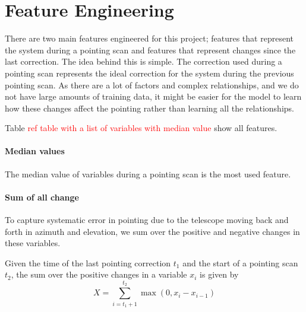 \section{Feature Engineering}\label{sec:feature_engineering}
There are two main features engineered for this project; features that represent the system during a pointing scan and features that represent changes since the last correction. 
The idea behind this is simple. The correction used during a pointing scan represents the ideal correction for the system during the previous pointing scan.
As there are a lot of factors and complex relationships, and we do not have large amounts of training data, it might be easier for the model to learn 
how these changes affect the pointing rather than learning all the relationships.

Table \textcolor{red}{ref table with a list of variables with median value} show all features.



\paragraph{Median values}
The median value of variables during a pointing scan is the most used feature.

\paragraph{Sum of all change}
To capture systematic error in pointing due to the telescope moving back and forth in azimuth and elevation,
we sum over the positive and negative changes in these variables.

Given the time of the last pointing correction $t_1$ and the start of a pointing scan $t_2$, the sum over the positive changes in a variable $x_i$ is given by
\begin{equation}\label{eq:positive_int}
    X = \sum_{i=t_1+1}^{t_2} \max(0, x_i-x_{i-1})
\end{equation}

